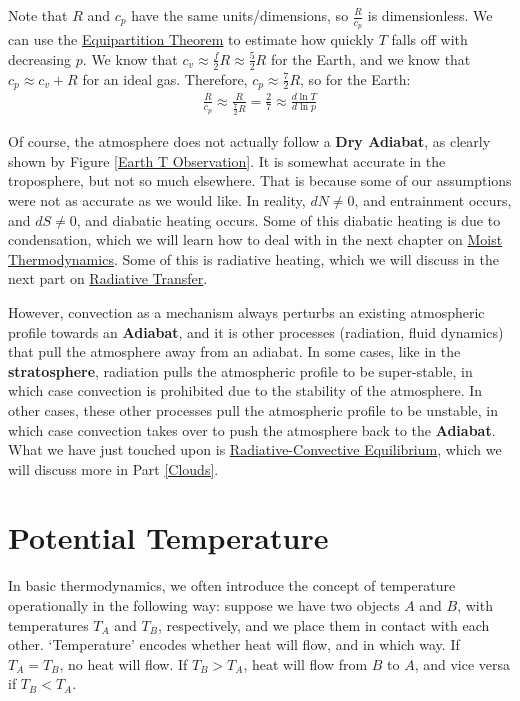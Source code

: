 Note that $R$ and $c_p$ have the same units/dimensions, so $\frac{R}{c_p}$ is dimensionless. We can use the \hyperref[Equipartition]{Equipartition Theorem} to estimate how quickly $T$ falls off with decreasing $p$. We know that $c_v\approx \frac{f}{2}R\approx\frac{5}{2}R$ for the Earth, and we know that $c_p\approx c_v+R$ for an ideal gas. Therefore, $c_p\approx \frac{7}{2}R$, so for the Earth:
\begin{align*}
    \frac{R}{c_p}\approx\frac{R}{\frac{7}{2}R}=\frac{2}{7}\approx\frac{d \ln T}{d \ln p}
\end{align*}

Of course, the atmosphere does not actually follow a \textbf{Dry Adiabat}, as clearly shown by Figure \ref{Earth T Observation}. It is somewhat accurate in the troposphere, but not so much elsewhere. That is because some of our assumptions were not as accurate as we would like. In reality, $dN\neq0$, and entrainment occurs, and $dS\neq0$, and diabatic heating occurs. Some of this diabatic heating is due to condensation, which we will learn how to deal with in the next chapter on \hyperref[Moist Thermodynamics]{Moist Thermodynamics}. Some of this is radiative heating, which we will discuss in the next part on \hyperref[Radiative Transfer]{Radiative Transfer}.

However, convection as a mechanism always perturbs an existing atmospheric profile towards an \textbf{Adiabat}, and it is other processes (radiation, fluid dynamics) that pull the atmosphere away from an adiabat. In some cases, like in the \textbf{stratosphere}, radiation pulls the atmospheric profile to be super-stable, in which case convection is prohibited due to the stability of the atmosphere. In other cases, these other processes pull the atmospheric profile to be unstable, in which case convection takes over to push the atmosphere back to the \textbf{Adiabat}. What we have just touched upon is \hyperref[Radiative-Convective Equilibrium]{Radiative-Convective Equilibrium}, which we will discuss more in Part \ref{Clouds}.

\section{Potential Temperature}

In basic thermodynamics, we often introduce the concept of temperature operationally in the following way: suppose we have two objects $A$ and $B$, with temperatures $T_A$ and $T_B$, respectively, and we place them in contact with each other. `Temperature' encodes whether heat will flow, and in which way. If $T_A=T_B$, no heat will flow. If $T_B>T_A$, heat will flow from $B$ to $A$, and vice versa if $T_B<T_A$.


